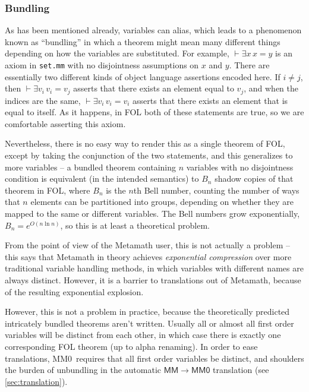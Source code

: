 \documentclass[runningheads]{llncs}
\newcommand{\mmO}{\textsf{MM0}}
\begin{document}
\subsubsection{Bundling}
As has been mentioned already, variables can alias, which leads to a phenomenon known as ``bundling'' in which a theorem might mean many different things depending on how the variables are substituted. For example, $\vdash\exists x\,x=y$ is an axiom in \texttt{set.mm} with no disjointness assumptions on $x$ and $y$. There are essentially two different kinds of object language assertions encoded here. If $i\ne j$, then $\vdash\exists v_i\,v_i=v_j$ asserts that there exists an element equal to $v_j$, and when the indices are the same, $\vdash\exists v_i\,v_i=v_i$ asserts that there exists an element that is equal to itself. As it happens, in FOL both of these statements are true, so we are comfortable asserting this axiom.

Nevertheless, there is no easy way to render this as a single theorem of FOL, except by taking the conjunction of the two statements, and this generalizes to more variables -- a bundled theorem containing $n$ variables with no disjointness condition is equivalent (in the intended semantics) to $B_n$ shadow copies of that theorem in FOL, where $B_n$ is the $n$th Bell number, counting the number of ways that $n$ elements can be partitioned into groups, depending on whether they are mapped to the same or different variables. The Bell numbers grow exponentially, $B_n=e^{O(n\ln n)}$, so this is at least a theoretical problem.

From the point of view of the Metamath user, this is not actually a problem -- this says that Metamath in theory achieves \emph{exponential compression} over more traditional variable handling methods, in which variables with different names are always distinct. However, it is a barrier to translations out of Metamath, because of the resulting exponential explosion.

However, this is not a problem in practice, because the theoretically predicted intricately bundled theorems aren't written. Usually all or almost all first order variables will be distinct from each other, in which case there is exactly one corresponding FOL theorem (up to alpha renaming). In order to ease translations, \mmO\ requires that all first order variables be distinct, and shoulders the burden of unbundling in the automatic $\mathsf{MM}\to\mathsf{MM0}$ translation (see \autoref{sec:translation}).
\end{document}
